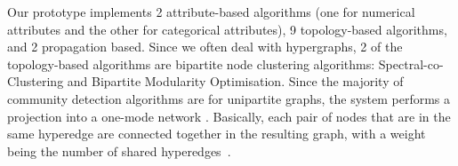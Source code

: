 



Our prototype implements 2 attribute-based algorithms (one for numerical attributes and the other for categorical attributes), 9 topology-based algorithms, and 2 propagation based. Since we often deal with hypergraphs, 2 of the topology-based algorithms are bipartite node clustering algorithms: Spectral-co-Clustering \cite{dhillonCoclusteringDocumentsWords2001} and Bipartite Modularity Optimisation\cite{guimeràModuleIdentificationBipartite2007}. Since the majority of community detection algorithms are for unipartite graphs, the system performs a projection into a one-mode network \cite{zhouBipartiteNetworkProjection2007}. Basically, each pair of nodes that are in the same hyperedge are connected together in the resulting graph, with a weight being the number of shared hyperedges~\cite{guimeràModuleIdentificationBipartite2007}.

